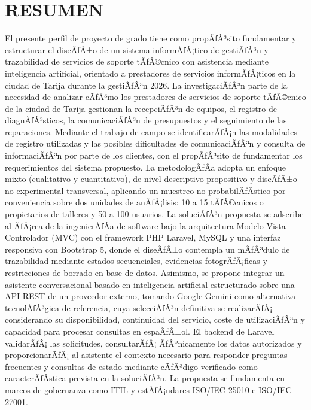 \chapter*{RESUMEN}

El presente perfil de proyecto de grado tiene como propÃƒÂ³sito fundamentar y estructurar el diseÃƒÂ±o de un sistema informÃƒÂ¡tico de gestiÃƒÂ³n y trazabilidad de servicios de soporte tÃƒÂ©cnico con asistencia mediante inteligencia artificial, orientado a prestadores de servicios informÃƒÂ¡ticos en la ciudad de Tarija durante la gestiÃƒÂ³n 2026. La investigaciÃƒÂ³n parte de la necesidad de analizar cÃƒÂ³mo los prestadores de servicios de soporte tÃƒÂ©cnico de la ciudad de Tarija gestionan la recepciÃƒÂ³n de equipos, el registro de diagnÃƒÂ³sticos, la comunicaciÃƒÂ³n de presupuestos y el seguimiento de las reparaciones. Mediante el trabajo de campo se identificarÃƒÂ¡n las modalidades de registro utilizadas y las posibles dificultades de comunicaciÃƒÂ³n y consulta de informaciÃƒÂ³n por parte de los clientes, con el propÃƒÂ³sito de fundamentar los requerimientos del sistema propuesto. La metodologÃƒÂ­a adopta un enfoque mixto (cualitativo y cuantitativo), de nivel descriptivo-propositivo y diseÃƒÂ±o no experimental transversal, aplicando un muestreo no probabilÃƒÂ­stico por conveniencia sobre dos unidades de anÃƒÂ¡lisis: 10 a 15 tÃƒÂ©cnicos o propietarios de talleres y 50 a 100 usuarios. La soluciÃƒÂ³n propuesta se adscribe al ÃƒÂ¡rea de la ingenierÃƒÂ­a de software bajo la arquitectura Modelo-Vista-Controlador (MVC) con el framework PHP Laravel, MySQL y una interfaz responsiva con Bootstrap 5, donde el diseÃƒÂ±o contempla un mÃƒÂ³dulo de trazabilidad mediante estados secuenciales, evidencias fotogrÃƒÂ¡ficas y restricciones de borrado en base de datos. Asimismo, se propone integrar un asistente conversacional basado en inteligencia artificial estructurado sobre una API REST de un proveedor externo, tomando Google Gemini como alternativa tecnolÃƒÂ³gica de referencia, cuya selecciÃƒÂ³n definitiva se realizarÃƒÂ¡ considerando su disponibilidad, continuidad del servicio, coste de utilizaciÃƒÂ³n y capacidad para procesar consultas en espaÃƒÂ±ol. El backend de Laravel validarÃƒÂ¡ las solicitudes, consultarÃƒÂ¡ ÃƒÂºnicamente los datos autorizados y proporcionarÃƒÂ¡ al asistente el contexto necesario para responder preguntas frecuentes y consultas de estado mediante cÃƒÂ³digo verificado como caracterÃƒÂ­stica prevista en la soluciÃƒÂ³n. La propuesta se fundamenta en marcos de gobernanza como ITIL y estÃƒÂ¡ndares ISO/IEC 25010 e ISO/IEC 27001.